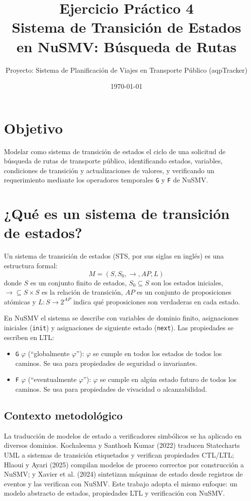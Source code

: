\documentclass[11pt,a4paper]{article}
\title{\textbf{Ejercicio Práctico 4}\\[2mm]
\large Sistema de Transición de Estados en NuSMV: Búsqueda de Rutas}
\author{Proyecto: Sistema de Planificación de Viajes en Transporte Público (aqpTracker)}
\date{\today}
\begin{document}
\maketitle

\section{Objetivo}

Modelar como sistema de transición de estados el ciclo de una solicitud de búsqueda de rutas de transporte público, identificando estados, variables, condiciones de transición y actualizaciones de valores, y verificando un requerimiento mediante los operadores temporales \texttt{G} y \texttt{F} de NuSMV.

\section{¿Qué es un sistema de transición de estados?}

Un sistema de transición de estados (STS, por sus siglas en inglés) es una estructura formal:
\[
M = (S, S_0, \rightarrow, AP, L)
\]
donde \(S\) es un conjunto finito de estados, \(S_0 \subseteq S\) son los estados iniciales, \(\rightarrow \subseteq S \times S\) es la relación de transición, \(AP\) es un conjunto de proposiciones atómicas y \(L : S \rightarrow 2^{AP}\) indica qué proposiciones son verdaderas en cada estado.

En NuSMV el sistema se describe con variables de dominio finito, asignaciones iniciales (\texttt{init}) y asignaciones de siguiente estado (\texttt{next}). Las propiedades se escriben en LTL:
\begin{itemize}
  \item \texttt{G} \(\varphi\) (``globalmente \(\varphi\)''): \(\varphi\) se cumple en todos los estados de todos los caminos. Se usa para propiedades de seguridad o invariantes.
  \item \texttt{F} \(\varphi\) (``eventualmente \(\varphi\)''): \(\varphi\) se cumple en algún estado futuro de todos los caminos. Se usa para propiedades de vivacidad o alcanzabilidad.
\end{itemize}

\subsection{Contexto metodológico}

La traducción de modelos de estado a verificadores simbólicos se ha aplicado en diversos dominios. Kochaleema y Santhosh Kumar (2022) traducen Statecharts UML a sistemas de transición etiquetados y verifican propiedades CTL/LTL; Hlaoui y Ayari (2025) compilan modelos de proceso correctos por construcción a NuSMV; y Xavier et al. (2024) sintetizan máquinas de estado desde registros de eventos y las verifican con NuSMV. Este trabajo adopta el mismo enfoque: un modelo abstracto de estados, propiedades LTL y verificación con NuSMV.
\end{document}
